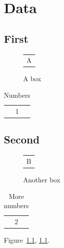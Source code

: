 \documentclass{report}
\begin{document}
\listoffigures
\listoftables
\chapter{Data}
\section{First}
\begin{figure}[h]
\centering
\begin{tabular}{c}A\end{tabular}
\caption{A box}\label{f}
\end{figure}
\begin{table}[h]
\centering
\caption{Numbers}
\begin{tabular}{c}1\end{tabular}
\end{table}
\section{Second}
\begin{figure}[h]
\centering
\begin{tabular}{c}B\end{tabular}
\caption{Another box}
\end{figure}
\begin{table}[h]
\centering
\caption{More numbers}
\begin{tabular}{c}2\end{tabular}
\end{table}
Figure~\ref{f}, \cref{f}.
\end{document}
